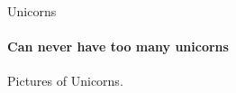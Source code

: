 
\begin{frame}{Unicorns}
\framesubtitle{Can never have too many unicorns}
Pictures of Unicorns.
\end{frame}

